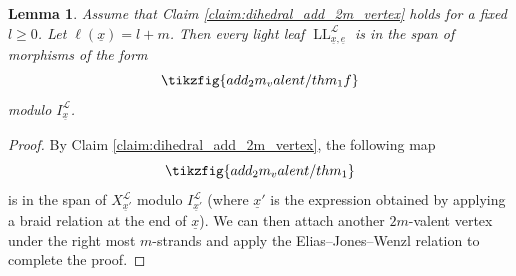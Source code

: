 \documentclass{amsart}
\newcommand{\scrL}{\mathcal{L}}
\DeclareMathOperator{\LL}{LL}
\newcommand{\ue}{\underline{e}}
\newcommand{\ux}{\underline{x}}
\newtheorem{lemma}[subsubsection]{Lemma}
\theoremstyle{definition}
\numberwithin{equation}{subsection}
\begin{document}
\begin{lemma}\label{lem:vertex_replacement}
    Assume that Claim \ref{claim:dihedral_add_2m_vertex} holds for a fixed $l \geq 0$. Let $\ell (\ux) = l + m$.
    Then every light leaf $\LL_{\ux, \ue}^{\scrL}$ is in the span of morphisms of the form 
    \[ \tikzfig{add_2m_valent/thm_1f}\]
    modulo $I_{\ux}^{\scrL}$.
\end{lemma}
\begin{proof}
    By Claim \ref{claim:dihedral_add_2m_vertex}, the following map
    \begin{equation*}
            \tikzfig{add_2m_valent/thm_1}
    \end{equation*}
    is in the span of $X_{\ux'}^{\scrL}$ modulo $I_{\ux'}^{\scrL}$ (where $\ux'$ is the expression obtained by applying a braid relation at the end of $\ux$).
    We can then attach another $2m$-valent vertex under the right most $m$-strands and apply the Elias--Jones--Wenzl relation to complete the proof.
\end{proof}
\end{document}
